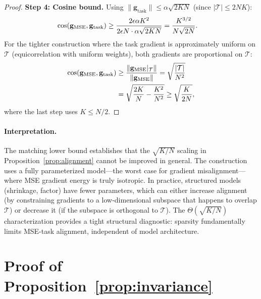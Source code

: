 \documentclass[letterpaper]{article}
\begin{document}
\begin{proof}
\textbf{Step 4: Cosine bound.} Using $\|\mathbf{g}_{\mathrm{task}}\| \leq \alpha\sqrt{2KN}$ (since $|\mathcal{T}| \leq 2NK$):
\begin{align}
\cos(\mathbf{g}_{\mathrm{MSE}}, \mathbf{g}_{\mathrm{task}}) &\geq \frac{2\epsilon\alpha K^2}{2\epsilon N \cdot \alpha\sqrt{2KN}} = \frac{K^{3/2}}{N\sqrt{2N}}. \notag
\end{align}
For the tighter construction where the task gradient is approximately uniform on $\mathcal{T}$ (equicorrelation with uniform weights), both gradients are proportional on $\mathcal{T}$:
\begin{align}
\cos(\mathbf{g}_{\mathrm{MSE}}, \mathbf{g}_{\mathrm{task}}) &\geq \frac{\|\mathbf{g}_{\mathrm{MSE}}|_\mathcal{T}\|}{\|\mathbf{g}_{\mathrm{MSE}}\|} = \sqrt{\frac{|\mathcal{T}|}{N^2}} \notag \\
&= \sqrt{\frac{2K}{N} - \frac{K^2}{N^2}} \geq \sqrt{\frac{K}{2N}}, \notag
\end{align}
where the last step uses $K \leq N/2$.
\end{proof}

\paragraph{Interpretation.} The matching lower bound establishes that the $\sqrt{K/N}$ scaling in Proposition~\ref{prop:alignment} cannot be improved in general. The construction uses a fully parameterized model---the worst case for gradient misalignment---where MSE gradient energy is truly isotropic. In practice, structured models (shrinkage, factor) have fewer parameters, which can either increase alignment (by constraining gradients to a low-dimensional subspace that happens to overlap $\mathcal{T}$) or decrease it (if the subspace is orthogonal to $\mathcal{T}$). The $\Theta(\sqrt{K/N})$ characterization provides a tight structural diagnostic: sparsity fundamentally limits MSE-task alignment, independent of model architecture.

\section{Proof of Proposition~\ref{prop:invariance}}
\label{app:invariance_proof}
\end{document}
